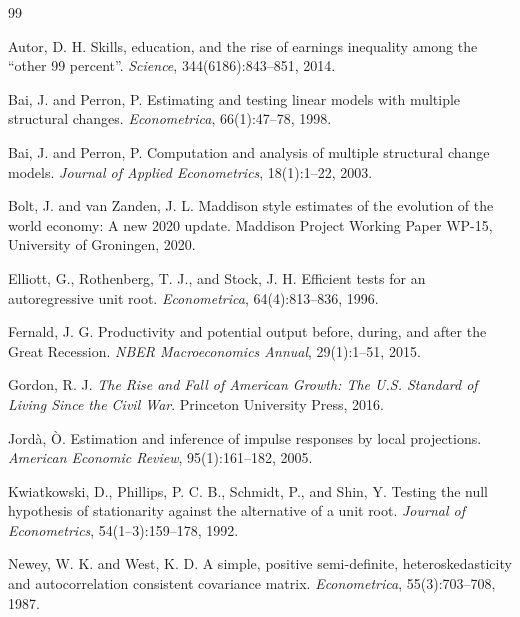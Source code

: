 \documentclass[11pt]{article}
\begin{document}
\begin{thebibliography}{99}

Autor, D. H.
\newblock Skills, education, and the rise of earnings inequality among the
``other 99 percent''.
\newblock \emph{Science}, 344(6186):843--851, 2014.

Bai, J. and Perron, P.
\newblock Estimating and testing linear models with multiple structural changes.
\newblock \emph{Econometrica}, 66(1):47--78, 1998.

Bai, J. and Perron, P.
\newblock Computation and analysis of multiple structural change models.
\newblock \emph{Journal of Applied Econometrics}, 18(1):1--22, 2003.

Bolt, J. and van Zanden, J. L.
\newblock Maddison style estimates of the evolution of the world economy: A new
2020 update.
\newblock Maddison Project Working Paper WP-15, University of Groningen, 2020.

Elliott, G., Rothenberg, T. J., and Stock, J. H.
\newblock Efficient tests for an autoregressive unit root.
\newblock \emph{Econometrica}, 64(4):813--836, 1996.

Fernald, J. G.
\newblock Productivity and potential output before, during, and after the Great
Recession.
\newblock \emph{NBER Macroeconomics Annual}, 29(1):1--51, 2015.

Gordon, R. J.
\newblock \emph{The Rise and Fall of American Growth: The U.S. Standard of Living
Since the Civil War}.
\newblock Princeton University Press, 2016.

Jord\`a, \`O.
\newblock Estimation and inference of impulse responses by local projections.
\newblock \emph{American Economic Review}, 95(1):161--182, 2005.

Kwiatkowski, D., Phillips, P. C. B., Schmidt, P., and Shin, Y.
\newblock Testing the null hypothesis of stationarity against the alternative of
a unit root.
\newblock \emph{Journal of Econometrics}, 54(1--3):159--178, 1992.

Newey, W. K. and West, K. D.
\newblock A simple, positive semi-definite, heteroskedasticity and
autocorrelation consistent covariance matrix.
\newblock \emph{Econometrica}, 55(3):703--708, 1987.


\end{thebibliography}
\end{document}
